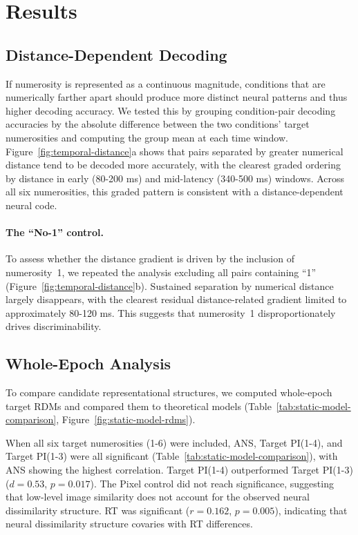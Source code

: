 \section{Results}

\subsection{Distance-Dependent Decoding}
If numerosity is represented as a continuous magnitude, conditions that
are numerically farther apart should produce more distinct neural
patterns and thus higher decoding accuracy. We tested this by grouping
condition-pair decoding accuracies by the absolute difference between
the two conditions' target numerosities and computing the group mean at
each time window.
Figure~\ref{fig:temporal-distance}a shows that pairs separated by
greater numerical distance tend to be decoded more accurately, with
the clearest graded ordering by distance in early (80-200 ms) and mid-latency
(340-500 ms) windows. Across all six numerosities, this graded pattern is consistent with a
distance-dependent neural code.

\paragraph{The ``No-1'' control.}
To assess whether the distance gradient is driven by the inclusion of
numerosity~1, we repeated the analysis excluding all pairs
containing ``1'' (Figure~\ref{fig:temporal-distance}b). Sustained
separation by numerical distance largely disappears, with the clearest
residual distance-related gradient limited to approximately 80-120 ms. This suggests that
numerosity~1 disproportionately drives discriminability.



\subsection{Whole-Epoch Analysis}
To compare candidate representational structures, we computed
whole-epoch target RDMs and compared them to theoretical models
(Table~\ref{tab:static-model-comparison},
Figure~\ref{fig:static-model-rdms}).



When all six target numerosities (1-6) were included, ANS, Target
PI(1-4), and Target PI(1-3) were all significant
(Table~\ref{tab:static-model-comparison}),
with ANS showing the highest correlation. Target PI(1-4) outperformed
Target PI(1-3) ($d = 0.53$, $p = 0.017$). The Pixel control did not
reach significance, suggesting that low-level image similarity does not
account for the observed neural dissimilarity structure. RT was significant ($r = 0.162$, $p = 0.005$),
indicating that neural dissimilarity structure covaries with RT
differences.

